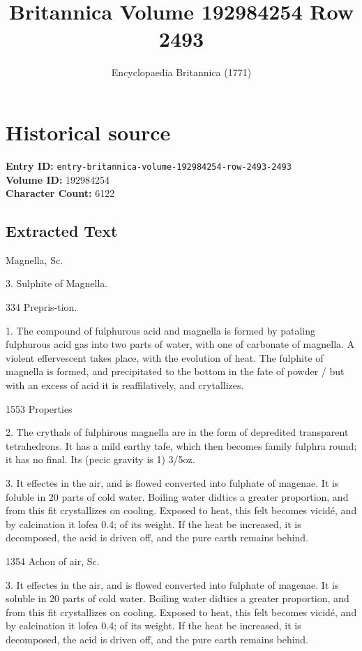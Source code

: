 \documentclass{article}
\title{Britannica Volume 192984254 Row 2493}
\date{Encyclopaedia Britannica (1771)}
\begin{document}
\maketitle

\section*{Historical source}
\textbf{Entry ID:} \texttt{entry-britannica-volume-192984254-row-2493-2493} \\
\textbf{Volume ID:} 192984254 \\
\textbf{Character Count:} 6122

\subsection*{Extracted Text}
Magnella,
Sc.

3. Sulphite of Magnella.

334
Prepris-tion.

1. The compound of fulphurous acid and magnella is formed by pataling fulphurous acid gas into two parts of water, with one of carbonate of magnella. A violent effervescent takes place, with the evolution of heat. The fulphite of magnella is formed, and precipitated to the bottom in the fate of powder / but with an excess of acid it is reaffilatively, and crytallizes.

1553
Properties

2. The crythals of fulphirous magnella are in the form of depredited transparent tetrahedrons. It has a mild earthy tafe, which then becomes family fulphra round; it has no final. Its (pecic gravity is 1) 3/5oz.

3. It effectes in the air, and is flowed converted into fulphate of magenae. It is foluble in 20 parts of cold water. Boiling water didtics a greater proportion, and from this fit crystallizes on cooling. Exposed to heat, this felt becomes vicidé, and by calcination it lofea 0.4; of its weight. If the heat be increased, it is decomposed, the acid is driven off, and the pure earth remains behind.

1354
Achon of
air, Sc.

3. It effectes in the air, and is flowed converted into fulphate of magenae. It is soluble in 20 parts of cold water. Boiling water didtics a greater proportion, and from this fit crystallizes on cooling. Exposed to heat, this felt becomes vicidé, and by calcination it lofea 0.4; of its weight. If the heat be increased, it is decomposed, the acid is driven off, and the pure earth remains behind.
\end{document}
